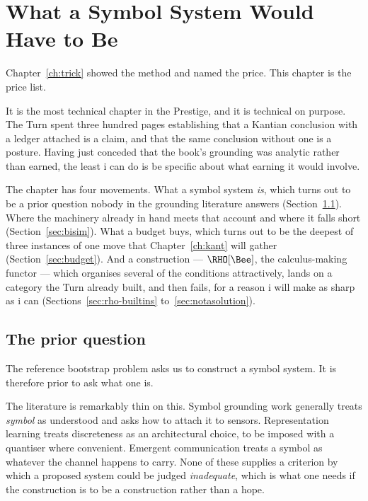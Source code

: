 \chapter{What a Symbol System Would Have to Be}
\label{ch:notation}

Chapter~\ref{ch:trick} showed the method and named the price.
This chapter is the price list.

It is the most technical chapter in the Prestige, and it is
technical on purpose.
The Turn spent three hundred pages establishing that a Kantian
conclusion with a ledger attached is a claim, and that the same
conclusion without one is a posture.
Having just conceded that the book's grounding was analytic rather
than earned, the least i can do is be specific about what earning
it would involve.

The chapter has four movements.
What a symbol system \emph{is}, which turns out to be a prior
question nobody in the grounding literature answers
(Section~\ref{sec:goodman}).
Where the machinery already in hand meets that account and where it
falls short (Section~\ref{sec:bisim}).
What a budget buys, which turns out to be the deepest of three
instances of one move that Chapter~\ref{ch:kant} will gather
(Section~\ref{sec:budget}).
And a construction --- $\RHO[\Bee]$, the calculus-making functor
--- which organises several of the conditions attractively, lands
on a category the Turn already built, and then fails, for a reason
i will make as sharp as i can (Sections~\ref{sec:rho-builtins}
to~\ref{sec:notasolution}).

\section{The prior question}
\label{sec:goodman}

The reference bootstrap problem asks us to construct a symbol
system.
It is therefore prior to ask what one is.

The literature is remarkably thin on this.
Symbol grounding work generally treats \emph{symbol} as understood
and asks how to attach it to sensors.
Representation learning treats discreteness as an architectural
choice, to be imposed with a quantiser where convenient.
Emergent communication treats a symbol as whatever the channel
happens to carry.
None of these supplies a criterion by which a proposed system could
be judged \emph{inadequate}, which is what one needs if the
construction is to be a construction rather than a hope.


